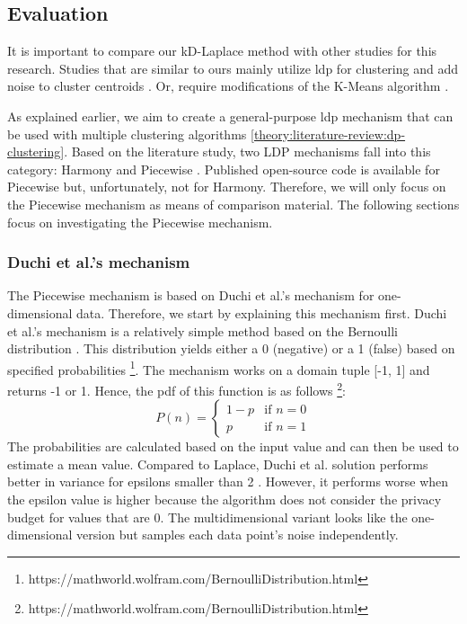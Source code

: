 \subsection{Evaluation}
It is important to compare our kD-Laplace method with other studies for this research.
Studies that are similar to ours mainly utilize \gls{ldp} for clustering and add noise to cluster centroids \citep{xia_distributed_2020, yuan_privacypreserving_2021, 9679364}.
Or, require modifications of the K-Means algorithm \citep{sun_distributed_2019}.

As explained earlier, we aim to create a general-purpose \gls{ldp} mechanism that can be used with multiple clustering algorithms \ref{theory:literature-review:dp-clustering}.
Based on the literature study, two LDP mechanisms fall into this category: Harmony and Piecewise \citep{nguyen_collecting_2016, wang_collecting_2019}.
Published open-source code is available for Piecewise but, unfortunately, not for Harmony.
Therefore, we will only focus on the Piecewise mechanism as means of comparison material.
The following sections focus on investigating the Piecewise mechanism.

\subsubsection{Duchi et al.'s mechanism}
The Piecewise mechanism is based on Duchi et al.'s mechanism for one-dimensional data.
Therefore, we start by explaining this mechanism first.
Duchi et al.'s mechanism is a relatively simple method based on the Bernoulli distribution \citep{duchi_minimax_2017}.
This distribution yields either a 0 (negative) or a 1 (false) based on specified probabilities \footnote{https://mathworld.wolfram.com/BernoulliDistribution.html}.
The mechanism works on a domain tuple [-1, 1] and returns -1 or 1.
Hence, the \gls{pdf} of this function is as follows \footnote{https://mathworld.wolfram.com/BernoulliDistribution.html}:
\begin{equation}
  P(n) =
  \begin{cases}
    1 - p & \text{if } n = 0 \\
    p     & \text{if } n = 1
  \end{cases}
\end{equation}
The probabilities are calculated based on the input value and can then be used to estimate a mean value.
Compared to Laplace, Duchi et al. solution performs better in variance for epsilons smaller than 2 \citep{wang_collecting_2019}.
However, it performs worse when the epsilon value is higher because the algorithm does not consider the privacy budget for values that are 0.
The multidimensional variant looks like the one-dimensional version but samples each data point's noise independently.

